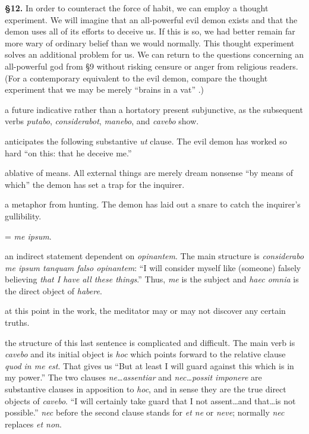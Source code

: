 \prenotes

\textbf{§12.} In order to counteract the force of habit, we can employ a thought experiment. We will imagine that an all-powerful evil demon exists and that the demon uses all of its efforts to deceive us. If this is so, we had better remain far more wary of ordinary belief than we would normally. This thought experiment solves an additional problem for us. We can return to the questions concerning an all-powerful god from §9 without risking censure or anger from religious readers. (For a contemporary equivalent to the evil demon, compare the thought experiment that we may be merely ``brains in a vat'' \parencite[5]{harman1973}.)

 a future indicative rather than a hortatory present subjunctive, as the subsequent verbs \textit{putabo}, \textit{considerabot}, \textit{manebo}, and \textit{cavebo} show.

 anticipates the following substantive \textit{ut} clause. The evil demon has worked so hard ``on this: that he deceive me.''

 ablative of means. All external things are merely dream nonsense ``by means of which'' the demon has set a trap for the inquirer.

 a metaphor from hunting. The demon has laid out a snare to catch the inquirer's gullibility.

 = \textit{me ipsum}.

 an indirect statement dependent on \textit{opinantem}. The main structure is \textit{considerabo me ipsum tanquam falso opinantem}: ``I will consider myself like (someone) falsely believing \textit{that I have all these things}.'' Thus, \textit{me} is the subject and \textit{haec omnia} is the direct object of \textit{habere}.

 at this point in the work, the meditator may or may not discover any certain truths.

 the structure of this last sentence is complicated and difficult. The main verb is \textit{cavebo} and its initial object is \textit{hoc} which points forward to the relative clause \textit{quod in me est}. That gives us ``But at least I will guard against this which is in my power.'' The two clauses \textit{ne\dots assentiar} and \textit{nec\dots possit imponere} are substantive clauses in apposition to \textit{hoc}, and in sense they are the true direct objects of \textit{cavebo}. ``I will certainly take guard that I not assent\dots and that\dots is not possible.'' \textit{nec} before the second clause stands for \textit{et ne} or \textit{neve}; normally \textit{nec} replaces \textit{et non}.

